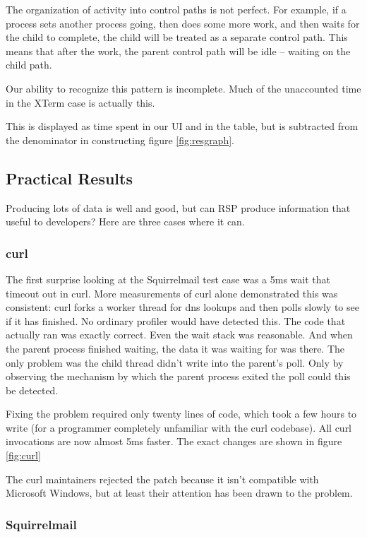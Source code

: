\documentclass[10pt]{article}
\begin{document}
The organization of activity into control paths is not perfect.  For example, if a process sets another process going, then does some more work, and then waits for the child to complete, the child will be treated as a separate control path.  This means that after the work, the parent control path will be idle -- waiting on the child path.

Our ability to recognize this pattern is incomplete.  Much of the unaccounted time in the XTerm case is actually this.

This is displayed as time spent in our UI and in the table, but is subtracted from the denominator in constructing figure \ref{fig:resgraph}.

\subsection{Practical Results}

Producing lots of data is well and good, but can RSP produce information that useful to developers?  Here are three cases where it can.

\subsubsection{curl}

The first surprise looking at the Squirrelmail test case was a 5ms wait that timeout out in curl.  More measurements of curl alone demonstrated this was consistent: curl forks a worker thread for dns lookups and then polls slowly to see if it has finished.  No ordinary profiler would have detected this.  The code that actually ran was exactly correct.  Even the wait stack was reasonable.  And when the parent process finished waiting, the data it was waiting for was there.  The only problem was the child thread didn't write into the parent's poll.  Only by observing the mechanism by which the parent process exited the poll could this be detected.

Fixing the problem required only twenty lines of code, which took a few hours to write (for a programmer completely unfamiliar with the curl codebase).  All curl invocations are now almost 5ms faster.  The exact changes are shown in figure \ref{fig:curl}

The curl maintainers rejected the patch because it isn't compatible with Microsoft Windows, but at least their attention has been drawn to the problem.

\subsubsection{Squirrelmail}
\end{document}
